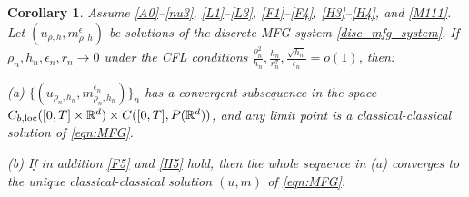 \documentclass[a4paper,  twoside, 10pt, leqno]{amsart}
\newcommand{\rd}{\mathbb{R}^d}
\newtheorem{corollary}[thm]{Corollary}
\theoremstyle{remark}
\theoremstyle{definition}
\begin{document}
\begin{corollary} \label{corollary:mfg_convergence_classical}
   Assume \ref{A0}--\ref{nu3}, \ref{L1}--\ref{L3}, \ref{F1}--\ref{F4}, \ref{H3}--\ref{H4}, and
   \ref{M111}. Let $(u_{\rho,h}, m^{\epsilon}_{\rho,h})$ be  solutions of the discrete MFG system
\eqref{disc_mfg_system}. If $\rho_n,h_n,\epsilon_n,r_n\to 0$ under the CFL conditions $\frac{\rho_n^2}{h_n},\frac{h_n}{r_n^{\sigma}},\frac{\sqrt{h_n}}{\epsilon_n}=o(1)$, then:

\smallskip\noindent   (a) $\{(u_{\rho_n,h_n}, m^{\epsilon_n}_{\rho_n,h_n})\}_n$ has a convergent subsequence in the space $C_{b,\textup{loc}}([0,T]\times\rd)\times C ( [ 0,T ], P ( \rd) )$, and any limit point is a classical-classical solution of \eqref{eqn:MFG}.
   
 \smallskip\noindent  (b) If in addition \ref{F5} and \ref{H5} hold, then the whole sequence in (a)
 converges to the unique classical-classical solution $(u,m)$ of \eqref{eqn:MFG}.
\end{corollary}
\end{document}
